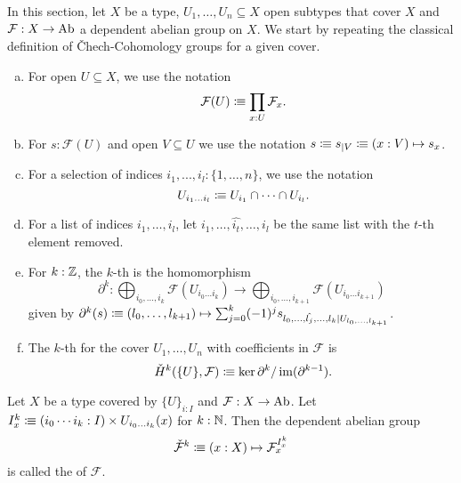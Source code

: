 
In this section, let $X$ be a type, $U_1,\dots,U_n\subseteq X$ open subtypes that cover $X$
and $\mathcal F:X\to \operatorname{Ab}$ a dependent abelian group on $X$.
We start by repeating the classical definition of \v{C}hech-Cohomology groups for a given cover.

\begin{definition}%
  \label{chech-complex}
  \begin{enumerate}[(a)]
  \item {} For open $U\subseteq X$, we use the notation
    \[
      \mathcal F(U)\colonequiv \prod_{x:U}\mathcal F_x\rlap{.}
    \]
  \item For $s:\mathcal F(U)$ and open $V\subseteq U$ we use the notation $s\vcentcolon\mspace{-1.2mu}\equiv s_{|V} \vcentcolon\mspace{-1.2mu}\equiv (x:V)\mapsto s_x$.
  \item {}For a selection of indices $i_1,...,i_l:\{1,\dots,n\}$, we use the notation
    \[
      U_{i_1\dots i_l}\colonequiv U_{i_1}\cap\dots\cap U_{i_l}\rlap{.}
    \]
  \item For a list of indices $i_1,\dots,i_l$, let $i_1,\dots,\hat{i_t},\dots,i_l$ be the same list with the $t$-th element removed.
  \item For $k:\mathbb{Z}$, the $k$-th  is the homomorphism
    \[
      \partial^k:\bigoplus_{i_0,\dots,i_k}\mathcal F(U_{i_0\dots i_k})\to \bigoplus_{i_0,\dots,i_{k+1}}\mathcal F(U_{i_0\dots i_{k+1}})
    \]
    given by $\partial^k(s)\vcentcolon\mspace{-1.2mu}\equiv (l_0,\dots,l_{k+1}) \mapsto \sum_{j=0}^k (-1)^j s_{l_0,\dots,\hat{l_j},\dots,l_k|U_{l_0,\dots,l_{k+1}}}$.
  \item The $k$-th  for the cover $U_1,\dots,U_n$ with coefficients in $\mathcal F$ is
    \[
      \check{H}^k(\{U\},\mathcal F)\colonequiv \ker\partial^{k} / \im(\partial^{k-1})\rlap{.}
    \]
  \end{enumerate}
\end{definition}

\begin{definition}
  \label{sheaf-cech}
  Let $X$ be a type covered by $\{U\}_{i:I}$ and $\mathcal F : X\to \operatorname{Ab}$.
  Let $I_x^k\vcentcolon\mspace{-1.2mu}\equiv (i_0 \cdots i_k:I)\times U_{i_0\dots i_k}(x)$ for $k:\mathbb{N}$.
  Then the dependent abelian group
  \[ \check{\mathcal F}^k\vcentcolon\mspace{-1.2mu}\equiv (x:X)\mapsto \mathcal F_x^{I_x^k} \]
  is called the  of $\mathcal F$.
\end{definition}

